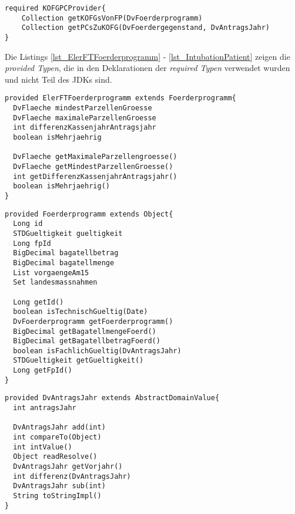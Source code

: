 \begin{lstlisting}[style = dsl, caption = Deklaration von KOFGPCProvider, captionpos = b, label = lst_tei7]
required KOFGPCProvider{
	Collection getKOFGsVonFP(DvFoerderprogramm)
	Collection getPCsZuKOFG(DvFoerdergegenstand, DvAntragsJahr)
}
\end{lstlisting}
\noindent
Die Listings \ref{lst_ElerFTFoerderprogramm} - \ref{lst_IntubationPatient} zeigen die \emph{provided Typen}, die in den Deklarationen der \emph{required Typen} verwendet wurden und nicht Teil des JDKs sind.
\begin{lstlisting}[style = dsl, caption = Deklaration von ElerFTFoerderprogramm, captionpos = b, label = lst_ElerFTFoerderprogramm]
provided ElerFTFoerderprogramm extends Foerderprogramm{
  DvFlaeche mindestParzellenGroesse
  DvFlaeche maximaleParzellenGroesse
  int differenzKassenjahrAntragsjahr
  boolean isMehrjaehrig
  
  DvFlaeche getMaximaleParzellengroesse()
  DvFlaeche getMindestParzellenGroesse()
  int getDifferenzKassenjahrAntragsjahr()
  boolean isMehrjaehrig()
}
\end{lstlisting}
\begin{lstlisting}[style = dsl, caption = Deklaration von Foerderprogramm, captionpos = b, label = lst_Foerderprogramm]
provided Foerderprogramm extends Object{
  Long id
  STDGueltigkeit gueltigkeit
  Long fpId
  BigDecimal bagatellbetrag
  BigDecimal bagatellmenge
  List vorgaengeAm15
  Set landesmassnahmen
  
  Long getId()
  boolean isTechnischGueltig(Date)
  DvFoerderprogramm getFoerderprogramm()
  BigDecimal getBagatellmengeFoerd()
  BigDecimal getBagatellbetragFoerd()
  boolean isFachlichGueltig(DvAntragsJahr)
  STDGueltigkeit getGueltigkeit()
  Long getFpId()
}
\end{lstlisting}
\begin{lstlisting}[style = dsl, caption = Deklaration von DvAntragsJahr, captionpos = b, label = lst_dvantragsjahr]
provided DvAntragsJahr extends AbstractDomainValue{
  int antragsJahr
  
  DvAntragsJahr add(int)
  int compareTo(Object)
  int intValue()
  Object readResolve()
  DvAntragsJahr getVorjahr()
  int differenz(DvAntragsJahr)
  DvAntragsJahr sub(int)
  String toStringImpl()
}
\end{lstlisting}
